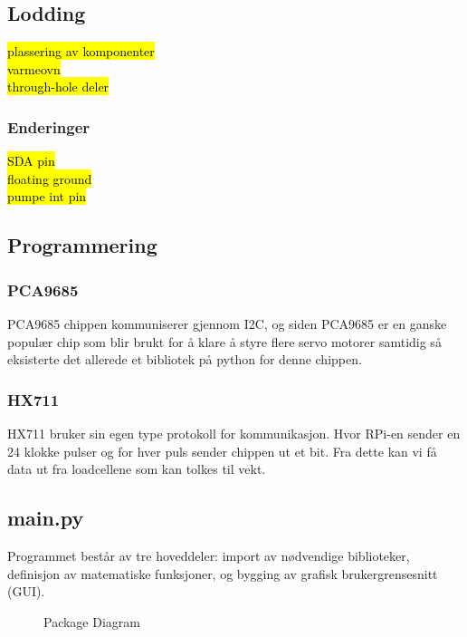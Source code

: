 \subsection{Lodding}
    \hl{plassering av komponenter\\
    varmeovn\\
    through-hole deler}
\subsubsection{Enderinger}
    \hl{SDA pin\\
    floating ground\\
    pumpe int pin}

\subsection{Programmering}
\subsubsection{PCA9685}
PCA9685 chippen kommuniserer gjennom I2C, og siden PCA9685 er en ganske populær chip som blir brukt for å klare å styre flere servo motorer samtidig så eksisterte det allerede et bibliotek på python for denne chippen.

\subsubsection{HX711}
HX711 bruker sin egen type protokoll for kommunikasjon. Hvor RPi-en sender en 24 klokke pulser og for hver puls sender chippen ut et bit. Fra dette kan vi få data ut fra loadcellene som kan tolkes til vekt.

\subsection{main.py}
Programmet består av tre hoveddeler: import av nødvendige biblioteker, 
definisjon av matematiske funksjoner, og bygging av grafisk brukergrensesnitt (GUI).

\begin{figure}[H]
    \centering
    
    \caption{Package Diagram}
    \label{fig:PackageDiagram}
\end{figure}

